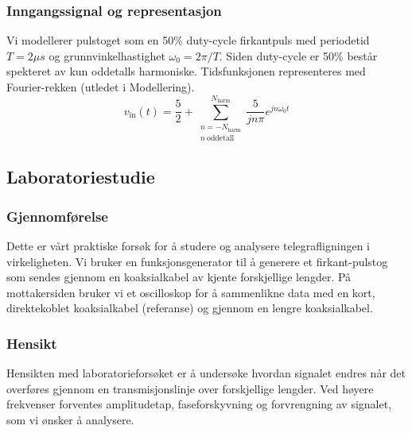 \subsubsection{Inngangssignal og representasjon}
Vi modellerer pulstoget som en 50\% duty-cycle firkantpuls med periodetid $T = 2 \mu s$ og grunnvinkelhastighet $\omega_0 = 2\pi / T$. Siden duty-cycle er 50\% består spekteret av kun oddetalls harmoniske. Tidsfunksjonen representeres med Fourier-rekken (utledet i Modellering).
\begin{equation}
    v_{\mathrm{in}}(t) = \frac{5}{2} + \sum_{\substack{n=-N_{\mathrm{harm}}\\ n\ \text{oddetall}}}^{N_{\mathrm{harm}}}\frac{5}{jn\pi} e^{jn\omega_0 t}
\end{equation} 
\clearpage

\subsection{Laboratoriestudie}
\subsubsection{Gjennomførelse} Dette er vårt praktiske forsøk for å studere og analysere telegrafligningen i virkeligheten. Vi bruker en funksjonsgenerator til å generere et firkant-pulstog som sendes gjennom en koaksialkabel av kjente forskjellige lengder. På mottakersiden bruker vi et oscilloskop for å sammenlikne data med en kort, direktekoblet koaksialkabel (referanse) og gjennom en lengre koaksialkabel.

\subsubsection{Hensikt} Hensikten med laboratorieforsøket er å undersøke hvordan signalet endres når det overføres gjennom en transmisjonslinje over forskjellige lengder. Ved høyere frekvenser forventes amplitudetap, faseforskyvning og forvrengning av signalet, som vi ønsker å analysere.
